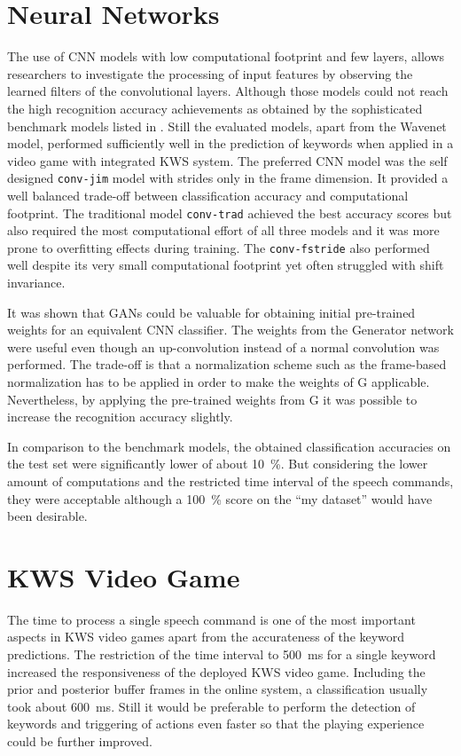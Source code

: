 \section{Neural Networks}
The use of CNN models with low computational footprint and few layers, allows researchers to investigate the processing of input features by observing the learned filters of the convolutional layers.
Although those models could not reach the high recognition accuracy achievements as obtained by the sophisticated benchmark models listed in .
Still the evaluated models, apart from the Wavenet model, performed sufficiently well in the prediction of keywords when applied in a video game with integrated KWS system.
The preferred CNN model was the self designed \texttt{conv-jim} model with strides only in the frame dimension.
It provided a well balanced trade-off between classification accuracy and computational footprint.
The traditional model \texttt{conv-trad} achieved the best accuracy scores but also required the most computational effort of all three models and it was more prone to overfitting effects during training.
The \texttt{conv-fstride} also performed well despite its very small computational footprint yet often struggled with shift invariance.

It was shown that GANs could be valuable for obtaining initial pre-trained weights for an equivalent CNN classifier.
The weights from the Generator network were useful even though an up-convolution instead of a normal convolution was performed.
The trade-off is that a normalization scheme such as the frame-based normalization has to be applied in order to make the weights of G applicable.
Nevertheless, by applying the pre-trained weights from G it was possible to increase the recognition accuracy slightly.

In comparison to the benchmark models, the obtained classification accuracies on the test set were significantly lower of about \SI{10}{\percent}.
But considering the lower amount of computations and the restricted time interval of the speech commands, they were acceptable although a \SI{100}{\percent} score on the \enquote{my dataset} would have been desirable.



\section{KWS Video Game}
The time to process a single speech command is one of the most important aspects in KWS video games apart from the accurateness of the keyword predictions.
The restriction of the time interval to \SI{500}{\milli\second} for a single keyword increased the responsiveness of the deployed KWS video game.
Including the prior and posterior buffer frames in the online system, a classification usually took about \SI{600}{\milli\second}.
Still it would be preferable to perform the detection of keywords and triggering of actions even faster so that the playing experience could be further improved.

